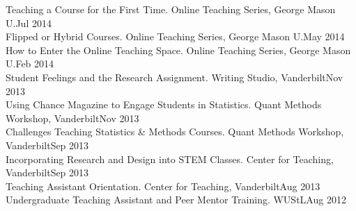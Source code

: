 Teaching a Course for the First Time. Online Teaching Series, George Mason U.\hfill{Jul 2014}\smallskip\\
Flipped or Hybrid Courses. Online Teaching Series, George Mason U.\hfill{May 2014}\smallskip\\
How to Enter the Online Teaching Space. Online Teaching Series, George Mason U.\hfill{Feb 2014}\smallskip\\
Student Feelings and the Research Assignment. Writing Studio, Vanderbilt\hfill{Nov 2013}\smallskip\\
Using Chance Magazine to Engage Students in Statistics. Quant Methods Workshop, Vanderbilt\hfill{Nov 2013}\smallskip\\
Challenges Teaching Statistics \& Methods Courses. Quant Methods Workshop, Vanderbilt\hfill{Sep 2013}\smallskip\\
Incorporating Research and Design into STEM Classes. Center for Teaching, Vanderbilt\hfill{Sep 2013}\smallskip\\
Teaching Assistant Orientation. Center for Teaching, Vanderbilt\hfill{Aug 2013}\smallskip\\
Undergraduate Teaching Assistant and Peer Mentor Training. WUStL\hfill{Aug 2012}